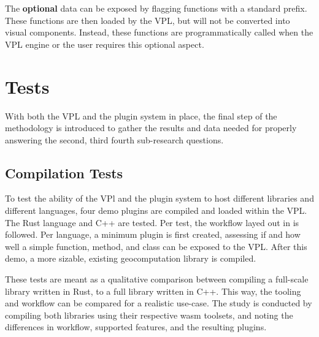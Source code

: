 The \textbf{optional} data can be exposed by flagging functions with a standard prefix.
These functions are then loaded by the VPL, but will not be converted into visual components. 
Instead, these functions are programmatically called when the VPL engine or the user requires this optional aspect. 






\section{Tests}
\label{sec:method:tests}
With both the VPL and the plugin system in place, the final step of the methodology is introduced to gather the results and data needed for properly answering the second, third fourth sub-research questions.

\subsection{Compilation Tests}
\label{sec:method:tests:compilation}

To test the ability of the VPl and the plugin system to host different libraries and different languages, four demo plugins are compiled and loaded within the VPL.  
The Rust language and C++ are tested. 
Per test, the workflow layed out in  is followed. 
Per language, a minimum plugin is first created, assessing if and how well a simple function, method, and class can be exposed to the VPL.
After this demo, a more sizable, existing geocomputation library is compiled.

These tests are meant as a qualitative comparison between compiling a full-scale library written in Rust, to a full library written in C++. 
This way, the tooling and workflow can be compared for a realistic use-case. 
The study is conducted by compiling both libraries using their respective \ac{wasm} toolsets, and noting the differences in workflow, supported features, and the resulting plugins. 

